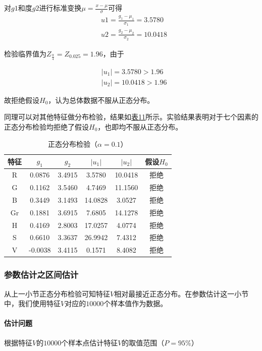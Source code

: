 \documentclass[UTF8]{ctexart}
\begin{document}
	对$g1$和度$g2$进行标准变换$\mu = \frac{x - \mu}{\sigma}$可得
	\begin{align*}
	& u1= \frac{g_1 - \mu_1}{\sigma_1} = 3.5780\\
	& u2= \frac{g_2 - \mu_2}{\sigma_2} = 10.0418
	\end{align*}
	
	检验临界值为$Z_{\frac{\alpha}{4}} = Z_{0.025} = 1.96$，由于
	
	\begin{align*}
	& |u_1| = 3.5780 > 1.96 \\
	& |u_2| = 10.0418 > 1.96
	\end{align*}
	
	故拒绝假设$H_0$，认为总体数据不服从正态分布。
	
	同理可以对其他特征做分布检验，结果如\hyperref[Chart.11]{表11}所示。实验结果表明对于七个因素的正态分布检验均拒绝了假设$H_0$，也即均不服从正态分布。
	
	\begin{table}[htbp]
		\centering
		\caption{正态分布检验（$\alpha=0.1$）}
		\begin{tabular}{cccccc}
			\toprule
			特征 & $g_1$ & $g_2$ & $|u_1|$ & $|u_2|$ & 假设$H_0$ \\
			\midrule
			R & 0.0876 & 3.4915 & 3.5780 & 10.0418 & 拒绝\\
			\midrule
			G & 0.1162 & 3.5460 & 4.7469 & 11.1560 & 拒绝\\
			\midrule
			B & 0.3449 & 3.1493 & 14.0828 & 3.0527 & 拒绝\\
			\midrule
			Gr & 0.1881 & 3.6915 & 7.6805 & 14.1278 & 拒绝\\
			\midrule
			H & 0.4169 & 2.8003 & 17.0257 & 4.0774 & 拒绝\\
			\midrule
			S & 0.6610 & 3.3637 & 26.9942 & 7.4312 & 拒绝\\
			\midrule
			V & -0.0038 & 3.4115 & 0.1571 & 8.4082 & 拒绝\\
			\bottomrule
		\end{tabular}%
		\label{Chart.11}%
	\end{table}%

	\subsubsection{参数估计之区间估计}
	从上一小节正态分布检验可知特征$V$相对最接近正态分布。在参数估计这一小节中，我们使用特征$V$对应的$10000$个样本值作为数据。
	
	\paragraph{估计问题} 根据特征$V$的$10000$个样本点估计特征$V$的取值范围（$P=95\%$）
	
\end{document}
